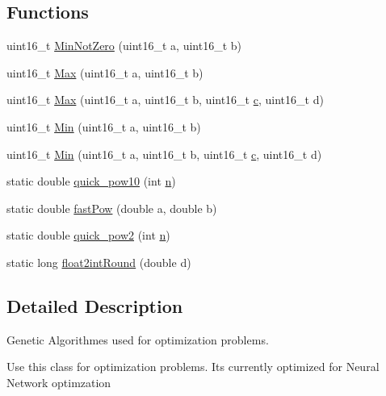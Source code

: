 \subsection*{Functions}
\begin{DoxyCompactItemize}
\item 
uint16\+\_\+t \hyperlink{namespace_soil_math_add4ac871cc7f2ece16e716a5cfa61847}{Min\+Not\+Zero} (uint16\+\_\+t a, uint16\+\_\+t b)
\item 
uint16\+\_\+t \hyperlink{namespace_soil_math_a9d385c44fb7e60a278a6eee8446f7b64}{Max} (uint16\+\_\+t a, uint16\+\_\+t b)
\item 
uint16\+\_\+t \hyperlink{namespace_soil_math_a4b71f10349d360c1d7c6313bb01c988f}{Max} (uint16\+\_\+t a, uint16\+\_\+t b, uint16\+\_\+t \hyperlink{_v_s_a___u_t_2_comparision_pictures_2_createtest_image_8m_ae0323a9039add2978bf5b49550572c7c}{c}, uint16\+\_\+t d)
\item 
uint16\+\_\+t \hyperlink{namespace_soil_math_ad458fb6889451aa72a4a7097d10490a5}{Min} (uint16\+\_\+t a, uint16\+\_\+t b)
\item 
uint16\+\_\+t \hyperlink{namespace_soil_math_a80286ce6881c7adacfba832254a8c91b}{Min} (uint16\+\_\+t a, uint16\+\_\+t b, uint16\+\_\+t \hyperlink{_v_s_a___u_t_2_comparision_pictures_2_createtest_image_8m_ae0323a9039add2978bf5b49550572c7c}{c}, uint16\+\_\+t d)
\item 
static double \hyperlink{namespace_soil_math_a1e4cf56fbcab8b4c623d6976868fbaf3}{quick\+\_\+pow10} (int \hyperlink{_v_s_a___u_t_2_comparision_pictures_2_createtest_image_8m_aeab71244afb687f16d8c4f5ee9d6ef0e}{n})
\item 
static double \hyperlink{namespace_soil_math_ab3886ae2a670a717bbe01f94543922a0}{fast\+Pow} (double a, double b)
\item 
static double \hyperlink{namespace_soil_math_a69d186af0e164a5f98c42985aabec919}{quick\+\_\+pow2} (int \hyperlink{_v_s_a___u_t_2_comparision_pictures_2_createtest_image_8m_aeab71244afb687f16d8c4f5ee9d6ef0e}{n})
\item 
static long \hyperlink{namespace_soil_math_a5b0b4bcf1fecd0f3eefc2520c624f9f4}{float2int\+Round} (double d)
\end{DoxyCompactItemize}


\subsection{Detailed Description}
Genetic Algorithmes used for optimization problems. 

Use this class for optimization problems. It\textquotesingle{}s currently optimized for Neural Network optimzation 

